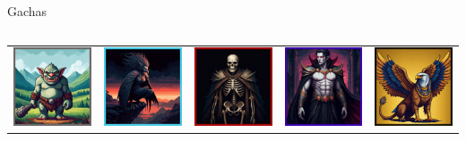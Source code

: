 \documentclass[12pt,aspectratio=169,notheorems]{beamer}
\begin{document}
\begin{frame}{Gachas}
\begin{columns}
\begin{column}{.85\textwidth}
\begin{tabular}{ccccc}
                    \includegraphics[width=.16\textwidth]{Orc (common).jpg} &
                    \includegraphics[width=.16\textwidth]{Harpy (non-common).jpg} &
                    \includegraphics[width=.16\textwidth]{Skeleton (rare).jpg} &
                    \includegraphics[width=.16\textwidth]{Vampire (epic).jpg} & 
                    \includegraphics[width=.16\textwidth]{Griffin (legendary).jpg} \\
                \end{tabular}
        \end{column}
        

\end{columns}
\end{frame}
\end{document}
